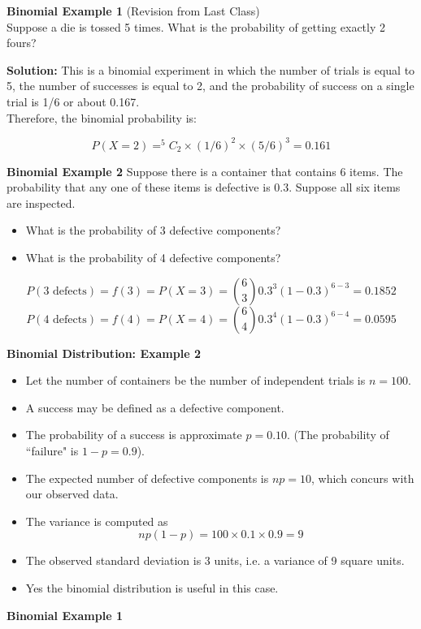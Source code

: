 {\item \textbf{ Binomial Example 1 }
(Revision from Last Class)\\
Suppose a die is tossed 5 times. What is the probability of getting exactly 2 fours?

\textbf{Solution:} This is a binomial experiment in which the number of trials is equal to 5, the number of successes is equal to 2, and the probability of success on a single trial is 1/6 or about 0.167. 
\\
\bigskip
Therefore, the binomial probability is:

\[P(X=2) = ^5C_2 \times (1/6)^2 \times (5/6)^3 = 0.161\]

\textbf{ Binomial Example 2 }
Suppose there is a container that contains 6 items.  The probability that any one of these items is defective is 0.3. Suppose all six items are inspected. 
\begin{itemize}
\item What is the probability of 3 defective components?
\item What is the probability of 4 defective components?
\end{itemize}

\[ P(3\text{ defects}) = f(3) = P(X = 3) = {6\choose 3}0.3^3 (1-0.3)^{6-3} = 0.1852 \]
\[ P(4\text{ defects}) = f(4) = P(X = 4) = {6\choose 4}0.3^4 (1-0.3)^{6-4} = 0.0595 \]


\item \textbf{Binomial Distribution: Example 2}

\begin{itemize}
\item Let the number of containers be the number of independent trials is $n=100$.
\item A success may be defined as a defective component.
\item The probability of a success is approximate $p=0.10$. (The probability of ``failure" is $1-p=0.9$).
\item The expected number of defective components is $np=10$, which concurs with our observed data.
\item The variance is computed as \[np(1-p) = 100 \times 0.1 \times 0.9 = 9\]
\item The observed standard deviation is 3 units, i.e. a variance of 9 square units.
\item Yes the binomial distribution is useful in this case.
\end{itemize}

\item \noindent \textbf{ Binomial Example 1}

}
